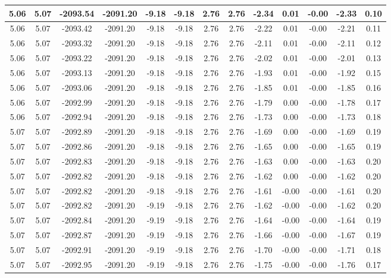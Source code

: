 \begin{table}[htbp]
\begin{adjustbox}{angle=90}
\begin{tabular}{|c|c|c|c|c|c|c|c|c|c|c|c|c|}
 5.06 & 5.07 & -2093.54 & -2091.20 & -9.18 & -9.18 & 2.76 & 2.76 & -2.34 & 0.01 & -0.00 & -2.33 & 0.10\\ \hline
 5.06 & 5.07 & -2093.42 & -2091.20 & -9.18 & -9.18 & 2.76 & 2.76 & -2.22 & 0.01 & -0.00 & -2.21 & 0.11\\ \hline
 5.06 & 5.07 & -2093.32 & -2091.20 & -9.18 & -9.18 & 2.76 & 2.76 & -2.11 & 0.01 & -0.00 & -2.11 & 0.12\\ \hline
 5.06 & 5.07 & -2093.22 & -2091.20 & -9.18 & -9.18 & 2.76 & 2.76 & -2.02 & 0.01 & -0.00 & -2.01 & 0.13\\ \hline
 5.06 & 5.07 & -2093.13 & -2091.20 & -9.18 & -9.18 & 2.76 & 2.76 & -1.93 & 0.01 & -0.00 & -1.92 & 0.15\\ \hline
 5.06 & 5.07 & -2093.06 & -2091.20 & -9.18 & -9.18 & 2.76 & 2.76 & -1.85 & 0.01 & -0.00 & -1.85 & 0.16\\ \hline
 5.06 & 5.07 & -2092.99 & -2091.20 & -9.18 & -9.18 & 2.76 & 2.76 & -1.79 & 0.00 & -0.00 & -1.78 & 0.17\\ \hline
 5.06 & 5.07 & -2092.94 & -2091.20 & -9.18 & -9.18 & 2.76 & 2.76 & -1.73 & 0.00 & -0.00 & -1.73 & 0.18\\ \hline
 5.07 & 5.07 & -2092.89 & -2091.20 & -9.18 & -9.18 & 2.76 & 2.76 & -1.69 & 0.00 & -0.00 & -1.69 & 0.19\\ \hline
 5.07 & 5.07 & -2092.86 & -2091.20 & -9.18 & -9.18 & 2.76 & 2.76 & -1.65 & 0.00 & -0.00 & -1.65 & 0.19\\ \hline
 5.07 & 5.07 & -2092.83 & -2091.20 & -9.18 & -9.18 & 2.76 & 2.76 & -1.63 & 0.00 & -0.00 & -1.63 & 0.20\\ \hline
 5.07 & 5.07 & -2092.82 & -2091.20 & -9.18 & -9.18 & 2.76 & 2.76 & -1.62 & 0.00 & -0.00 & -1.62 & 0.20\\ \hline
 5.07 & 5.07 & -2092.82 & -2091.20 & -9.18 & -9.18 & 2.76 & 2.76 & -1.61 & -0.00 & -0.00 & -1.61 & 0.20\\ \hline
 5.07 & 5.07 & -2092.82 & -2091.20 & -9.19 & -9.18 & 2.76 & 2.76 & -1.62 & -0.00 & -0.00 & -1.62 & 0.20\\ \hline
 5.07 & 5.07 & -2092.84 & -2091.20 & -9.19 & -9.18 & 2.76 & 2.76 & -1.64 & -0.00 & -0.00 & -1.64 & 0.19\\ \hline
 5.07 & 5.07 & -2092.87 & -2091.20 & -9.19 & -9.18 & 2.76 & 2.76 & -1.66 & -0.00 & -0.00 & -1.67 & 0.19\\ \hline
 5.07 & 5.07 & -2092.91 & -2091.20 & -9.19 & -9.18 & 2.76 & 2.76 & -1.70 & -0.00 & -0.00 & -1.71 & 0.18\\ \hline
 5.07 & 5.07 & -2092.95 & -2091.20 & -9.19 & -9.18 & 2.76 & 2.76 & -1.75 & -0.00 & -0.00 & -1.76 & 0.17\\ \hline

\end{tabular}
\end{adjustbox}
\end{table}
